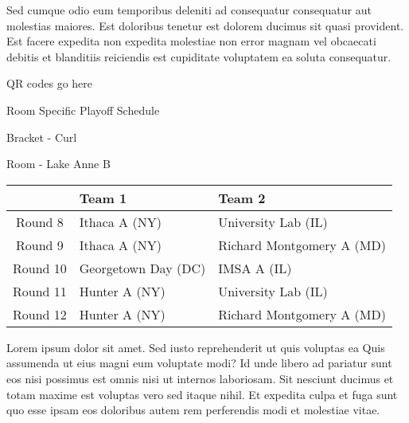 \documentclass{article}%
\begin{document}
\newline%
Sed cumque odio eum temporibus deleniti ad consequatur consequatur aut molestias maiores. Est doloribus tenetur est dolorem ducimus sit quasi provident. Est facere expedita non expedita molestiae non error magnam vel obcaecati debitis et blanditiis reiciendis est cupiditate voluptatem ea soluta consequatur.%
\vspace*{140pt}%
\begin{center}%
\begin{Huge}%
QR codes go here%
\end{Huge}%
\end{center}%
\newpage%
\begin{center}%
\begin{Huge}%
Room Specific Playoff Schedule%
\end{Huge}%
\vspace*{8pt}%
\linebreak%
\begin{Large}%
Bracket {-} Curl%
\end{Large}%
\vspace*{8pt}%
\linebreak%
\vspace*{8pt}%
\begin{Large}%
Room {-} Lake Anne B%
\end{Large}%
\end{center}%
%
\begin{tabularx}{\textwidth}{|c|Y|Y|}%
\hline%
&Team 1&Team 2\\%
\hline%
Round 8&Ithaca A (NY)&University Lab (IL)\\%
Round 9&Ithaca A (NY)&Richard Montgomery A (MD)\\%
Round 10&Georgetown Day (DC)&IMSA A (IL)\\%
Round 11&Hunter A (NY)&University Lab (IL)\\%
Round 12&Hunter A (NY)&Richard Montgomery A (MD)\\%
\hline%
\end{tabularx}%
\vspace*{8pt}%
\newline%
Lorem ipsum dolor sit amet. Sed iusto reprehenderit ut quis voluptas ea Quis assumenda ut eius magni eum voluptate modi? Id unde libero ad pariatur sunt eos nisi possimus est omnis nisi ut internos laboriosam. Sit nesciunt ducimus et totam maxime est voluptas vero sed itaque nihil. Et expedita culpa et fuga sunt quo esse ipsam eos doloribus autem rem perferendis modi et molestiae vitae.\newline%
\end{document}
